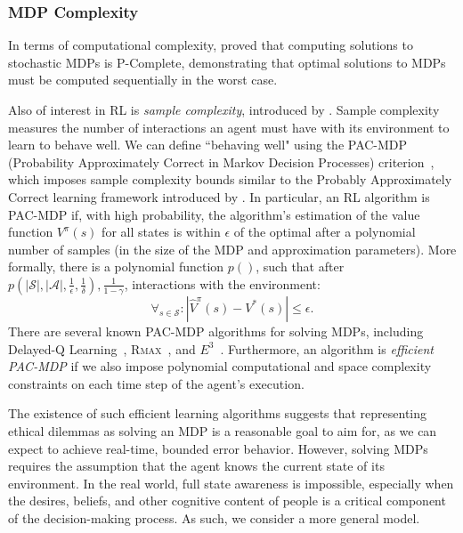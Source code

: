 \documentclass[11pt]{article}
\begin{document}
\subsubsection{MDP Complexity}

In terms of computational complexity,
\cite{papadimitriou1987complexity} proved that computing solutions to stochastic MDPs is P-Complete, demonstrating that optimal solutions to MDPs must be computed sequentially in the worst case.

Also of interest in RL is \emph{sample complexity}, introduced by \cite{kakade2003sample}. Sample complexity measures the number of interactions an agent must have with its environment to learn to behave well. We can define ``behaving well" using the PAC-MDP (Probability Approximately Correct in Markov Decision Processes) criterion~\cite{strehl2009reinforcement}, which imposes sample complexity bounds similar to the Probably Approximately Correct learning framework introduced by \cite{valiant1984theory}. In particular, an RL algorithm is PAC-MDP if, with high probability, the algorithm's estimation of the value function $V^\pi(s)$ for all states is within $\epsilon$ of the optimal after a polynomial number of samples (in the size of the MDP and approximation parameters). More formally, there is a polynomial function $p()$, such that after $p(|\mathcal{S}|, |\mathcal{A}|, \frac{1}{\epsilon}, \frac{1}{\delta}), \frac{1}{1-\gamma}$, interactions with the environment:
\begin{equation}
\forall_{s \in \mathcal{S}} : |\hat{V}^\pi(s) - V^*(s)| \leq \epsilon.
\end{equation}
There are several known PAC-MDP algorithms for solving MDPs, including Delayed-Q Learning~\cite{strehl2006pac}, \textsc{Rmax}~\cite{brafman2003r}, and $E^3$~\cite{kearns2002near}. Furthermore, an algorithm is {\it efficient PAC-MDP} if we also impose polynomial computational and space complexity constraints on each time step of the agent's execution.

The existence of such efficient learning algorithms suggests that representing ethical dilemmas as solving an MDP is a reasonable goal to aim for, as we can expect to achieve real-time, bounded error behavior. However, solving MDPs requires the assumption that the agent knows the current state of its environment. In the real world, full state awareness is impossible, especially when the desires, beliefs, and other cognitive content of people is a critical component of the decision-making process. As such, we consider a more general model.
\end{document}
